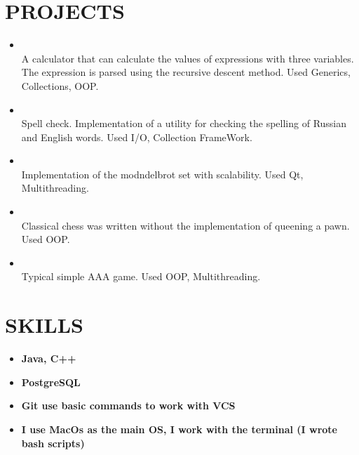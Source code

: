 \documentclass{resume}
\begin{document}
\section{PROJECTS}{\small
    \begin{itemize}
        \item {}\\
            {A calculator that can calculate the values ​​of expressions with three variables. The expression is parsed using the recursive descent method. Used Generics, Collections, OOP.}
        
        \item {}\\
            {Spell check. Implementation of a utility for checking the spelling of Russian and English words. Used I/O, Collection FrameWork.}
            
        \item {}\\
            {Implementation of the modndelbrot set with scalability. Used Qt, Multithreading.}
            
        \item {}\\
            {Classical chess was written without the implementation of queening a pawn. Used OOP.}
        
        \item {}\\
            {Typical simple AAA game. Used OOP, Multithreading.}
        
    \end{itemize}
}

\section{SKILLS}{\small
    \begin{itemize}
        \item \textbf {Java, C++}
        \item \textbf {PostgreSQL}
        \item \textbf {Git use basic commands to work with VCS}
        \item \textbf {I use MacOs as the main OS, I work with the terminal (I wrote bash scripts)}
    \end{itemize}
}
\end{document}
